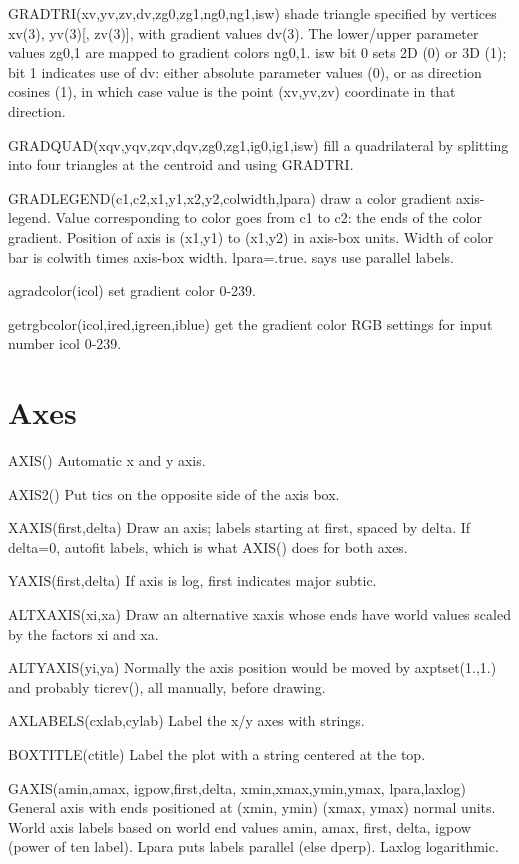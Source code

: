 \documentclass[12pt]{article}
\begin{document}
GRADTRI(xv,yv,zv,dv,zg0,zg1,ng0,ng1,isw) shade triangle specified by
vertices xv(3), yv(3)[, zv(3)], with gradient values dv(3). The
lower/upper parameter values zg0,1 are mapped to gradient colors
ng0,1. isw bit 0 sets 2D (0) or 3D (1); bit 1 indicates use of dv:
either absolute parameter values (0), or as direction cosines (1), in
which case value is the point (xv,yv,zv) coordinate in that direction.

GRADQUAD(xqv,yqv,zqv,dqv,zg0,zg1,ig0,ig1,isw) fill a quadrilateral 
by splitting into four triangles at the centroid and using GRADTRI. 

GRADLEGEND(c1,c2,x1,y1,x2,y2,colwidth,lpara) draw a color gradient
axis-legend. Value corresponding to color goes from c1 to c2: the ends of
the color gradient. Position of axis is (x1,y1) to (x1,y2) in axis-box
units. Width of color bar is colwith times axis-box
width. lpara=.true. says use parallel labels.

agradcolor(icol) set gradient color 0-239.

getrgbcolor(icol,ired,igreen,iblue) get the gradient color RGB
settings for input number icol 0-239.

\section{Axes}

AXIS() Automatic x and y axis.

AXIS2() Put tics on the opposite side of the axis box.

XAXIS(first,delta) Draw an axis; labels starting at first, spaced by delta.
If delta=0, autofit labels, which is what AXIS() does for both axes.

YAXIS(first,delta) If axis is log, first indicates major subtic.

ALTXAXIS(xi,xa) Draw an alternative xaxis whose ends have world values
scaled by the factors xi and xa.

ALTYAXIS(yi,ya) Normally the axis position would be moved by
axptset(1.,1.) and probably ticrev(), all manually, before drawing.

AXLABELS(cxlab,cylab) Label the x/y axes with strings.

BOXTITLE(ctitle) Label the plot with a string centered at the top.

GAXIS(amin,amax, igpow,first,delta, xmin,xmax,ymin,ymax, lpara,laxlog)
General axis with ends positioned at (xmin, ymin) (xmax, ymax) normal
units. World axis labels based on world end values amin, amax, first, delta,
igpow (power of ten label).  Lpara puts labels parallel (else
dperp). Laxlog logarithmic.
\end{document}
